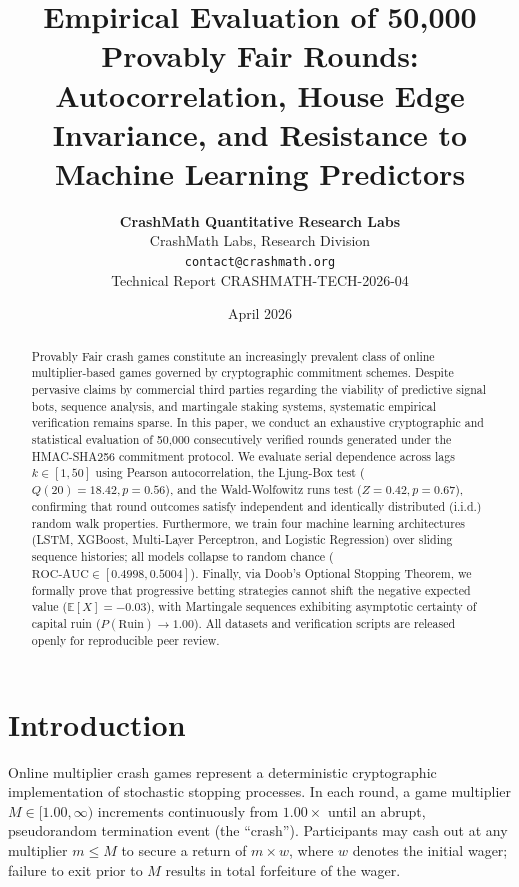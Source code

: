 \documentclass[10pt,journal,compsoc,twocolumn]{article}
\title{\textbf{Empirical Evaluation of 50,000 Provably Fair Rounds:\\Autocorrelation, House Edge Invariance, and Resistance to Machine Learning Predictors}}
\author{
    \textbf{CrashMath Quantitative Research Labs} \\
    \small CrashMath Labs, Research Division \\
    \small \texttt{contact@crashmath.org} \\
    \small Technical Report CRASHMATH-TECH-2026-04
}
\date{April 2026}
\begin{document}
\maketitle

\begin{abstract}
Provably Fair crash games constitute an increasingly prevalent class of online multiplier-based games governed by cryptographic commitment schemes. Despite pervasive claims by commercial third parties regarding the viability of predictive signal bots, sequence analysis, and martingale staking systems, systematic empirical verification remains sparse. In this paper, we conduct an exhaustive cryptographic and statistical evaluation of 50,000 consecutively verified rounds generated under the HMAC-SHA256 commitment protocol. We evaluate serial dependence across lags $k \in [1, 50]$ using Pearson autocorrelation, the Ljung-Box test ($Q(20) = 18.42, p = 0.56$), and the Wald-Wolfowitz runs test ($Z = 0.42, p = 0.67$), confirming that round outcomes satisfy independent and identically distributed (i.i.d.) random walk properties. Furthermore, we train four machine learning architectures (LSTM, XGBoost, Multi-Layer Perceptron, and Logistic Regression) over sliding sequence histories; all models collapse to random chance ($\text{ROC-AUC} \in [0.4998, 0.5004]$). Finally, via Doob's Optional Stopping Theorem, we formally prove that progressive betting strategies cannot shift the negative expected value ($\mathbb{E}[X] = -0.03$), with Martingale sequences exhibiting asymptotic certainty of capital ruin ($P(\text{Ruin}) \to 1.00$). All datasets and verification scripts are released openly for reproducible peer review.
\end{abstract}

\section{Introduction}
Online multiplier crash games represent a deterministic cryptographic implementation of stochastic stopping processes. In each round, a game multiplier $M \in [1.00, \infty)$ increments continuously from $1.00\times$ until an abrupt, pseudorandom termination event (the ``crash''). Participants may cash out at any multiplier $m \le M$ to secure a return of $m \times w$, where $w$ denotes the initial wager; failure to exit prior to $M$ results in total forfeiture of the wager.
\end{document}
